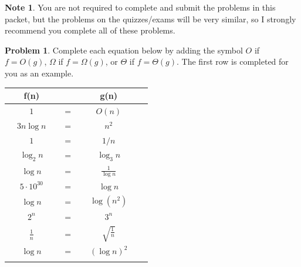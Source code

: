 \documentclass[10pt]{article}
\theoremstyle{definition}
\newtheorem{problem}{Problem}
\newtheorem{note}{Note}
\begin{document}
\newpage
\begin{note}
You are not required to complete and submit the problems in this packet,
but the problems on the quizzes/exams will be very similar,
so I strongly recommend you complete all of these problems.
\end{note}

\begin{problem}
    Complete each equation below by adding the symbol $O$ if $f=O(g)$, $\Omega$ if $f=\Omega(g)$, or $\Theta$ if $f=\Theta(g)$.  
    The first row is completed for you as an example.

{\renewcommand{\arraystretch}{4.4}
\begin{tabular}{c c c c c c}
    & f(n) &~\hspace{0.5in}~$ $~\hspace{0.5in}~& g(n) &\\
    \hline
    & $1$ & ~\hspace{0.5in}~$=$~\hspace{0.5in}~  & $O(n)$ &  &\\
    \arrayrulecolor{gray}\hline
    & $3 n\log n$ & ~\hspace{0.5in}~$=$~\hspace{0.5in}~  & $n^2$ &  &\\
    \arrayrulecolor{gray}\hline
    & $1$ & ~\hspace{0.5in}~$=$~\hspace{0.5in}~  & $1/n$ &  &\\
    \arrayrulecolor{gray}\hline
    & $\log_2 n$ & ~\hspace{0.5in}~$=$~\hspace{0.5in}~  & $\log_3 n$ &  &\\
    \arrayrulecolor{gray}\hline
    & $\log n$ & ~\hspace{0.5in}~$=$~\hspace{0.5in}~  & $\frac {1} {\log n}$ &  &\\
    \arrayrulecolor{gray}\hline
    & $5\cdot10^{30}$ & ~\hspace{0.5in}~$=$~\hspace{0.5in}~  & $\log n$ &  &\\
    \arrayrulecolor{gray}\hline
    & $\log n$ & ~\hspace{0.5in}~$=$~\hspace{0.5in}~  & $\log (n^2)$ &  &\\
    \arrayrulecolor{gray}\hline
    & $2^n$ & ~\hspace{0.5in}~$=$~\hspace{0.5in}~  & $3^n$ &  &\\
    \arrayrulecolor{gray}\hline
    & $\frac 1 n$ & ~\hspace{0.5in}~$=$~\hspace{0.5in}~  & $\sqrt{\frac 1 n}$ &  &\\
    \arrayrulecolor{gray}\hline
    & $\log n$ & ~\hspace{0.5in}~$=$~\hspace{0.5in}~  & $(\log n)^2$ &  &\\
    \arrayrulecolor{gray}\hline


\end{tabular}}
\end{problem}
\end{document}
